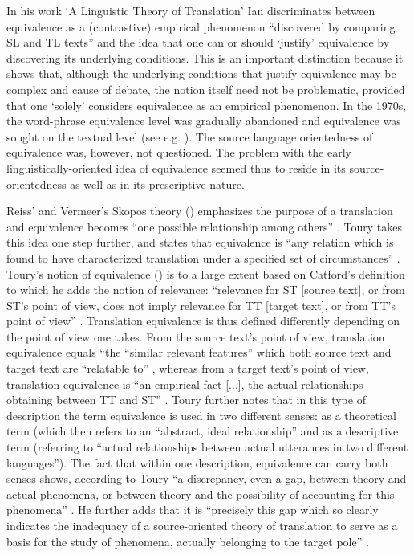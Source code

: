 In his work ‘A Linguistic Theory of Translation’ Ian \citet{catford_linguistic_1965} discriminates between equivalence as a (contrastive) empirical phenomenon “discovered by comparing SL and TL texts” \citep[27]{catford_linguistic_1965} and the idea that one can or should ‘justify’ equivalence by discovering its underlying conditions. This is an important distinction because it shows that, although the underlying conditions that justify equivalence may be complex and cause of debate, the notion itself need not be problematic, provided that one ‘solely’ considers equivalence as an empirical phenomenon. In the 1970s, the word-phrase equivalence level was gradually abandoned and equivalence was sought on the textual level (see e.g. \citealt{koller_einfuhrung_1979}). The source language orientedness of equivalence was, however, not questioned. The problem with the early linguistically-oriented idea of equivalence seemed thus to reside in its source-orientedness as well as in its prescriptive nature.

Reiss’ and Vermeer’s Skopos theory (\citeyear{reiss_grundlegung_1991}) emphasizes the purpose of a translation and equivalence becomes “one possible relationship among others” \citep[5]{schaffner_concept_1999}. Toury takes this idea one step further, and states that equivalence is “any relation which is found to have characterized translation under a specified set of circumstances” \citep[61]{toury_descriptive_1995}. Toury’s notion of equivalence (\citeyear[37 ff.]{toury_search_1980}) is to a large extent based on Catford’s definition to which he adds the notion of relevance: “relevance for ST [source text], or from ST’s point of view, does not imply relevance for TT [target text], or from TT’s point of view” \citep[11]{toury_search_1980}. Translation equivalence is thus defined differently depending on the point of view one takes. From the source text’s point of view, translation equivalence equals “the “similar relevant features” which both source text and target text are “relatable to” \citep[38]{toury_search_1980}, whereas from a target text’s point of view, translation equivalence is “an empirical fact [...], the actual relationships obtaining between TT and ST” \citep[39]{toury_search_1980}. Toury further notes that in this type of description the term equivalence is used in two different senses: as a theoretical term (which then refers to an “abstract, ideal relationship” and as a descriptive term (referring to “actual relationships between actual utterances in two different languages”). The fact that within one description, equivalence can carry both senses shows, according to Toury “a discrepancy, even a gap, between theory and actual phenomena, or between theory and the possibility of accounting for this phenomena” \citep[39]{toury_search_1980}. He further adds that it is “precisely this gap which so clearly indicates the inadequacy of a source-oriented theory of translation to serve as a basis for the study of phenomena, actually belonging to the target pole” \citep[39]{toury_search_1980}.

